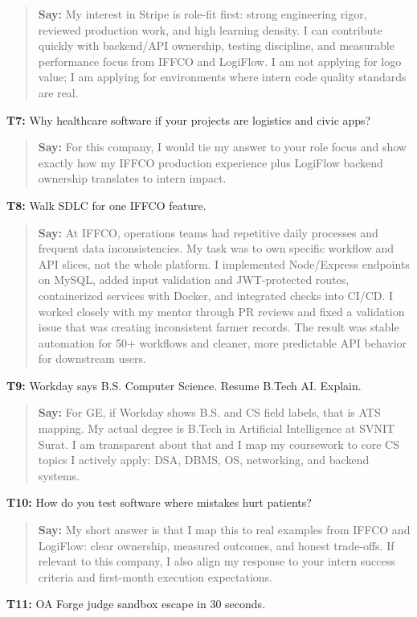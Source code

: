 \documentclass[9pt,a4paper]{article}
\begin{document}
\begin{quote}\small\textbf{Say:} My interest in Stripe is role-fit first: strong engineering rigor, reviewed production work, and high learning density. I can contribute quickly with backend/API ownership, testing discipline, and measurable performance focus from IFFCO and LogiFlow. I am not applying for logo value; I am applying for environments where intern code quality standards are real.\end{quote}
\vspace{2mm}
\textbf{T7:} Why healthcare software if your projects are logistics and civic apps?

\begin{quote}\small\textbf{Say:} For this company, I would tie my answer to your role focus and show exactly how my IFFCO production experience plus LogiFlow backend ownership translates to intern impact.\end{quote}
\vspace{2mm}
\textbf{T8:} Walk SDLC for one IFFCO feature.

\begin{quote}\small\textbf{Say:} At IFFCO, operations teams had repetitive daily processes and frequent data inconsistencies. My task was to own specific workflow and API slices, not the whole platform. I implemented Node/Express endpoints on MySQL, added input validation and JWT-protected routes, containerized services with Docker, and integrated checks into CI/CD. I worked closely with my mentor through PR reviews and fixed a validation issue that was creating inconsistent farmer records. The result was stable automation for 50+ workflows and cleaner, more predictable API behavior for downstream users.\end{quote}
\vspace{2mm}
\textbf{T9:} Workday says B.S. Computer Science. Resume B.Tech AI. Explain.

\begin{quote}\small\textbf{Say:} For GE, if Workday shows B.S. and CS field labels, that is ATS mapping. My actual degree is B.Tech in Artificial Intelligence at SVNIT Surat. I am transparent about that and I map my coursework to core CS topics I actively apply: DSA, DBMS, OS, networking, and backend systems.\end{quote}
\vspace{2mm}
\textbf{T10:} How do you test software where mistakes hurt patients?

\begin{quote}\small\textbf{Say:} My short answer is that I map this to real examples from IFFCO and LogiFlow: clear ownership, measured outcomes, and honest trade-offs. If relevant to this company, I also align my response to your intern success criteria and first-month execution expectations.\end{quote}
\vspace{2mm}
\textbf{T11:} OA Forge judge sandbox escape in 30 seconds.
\end{document}
